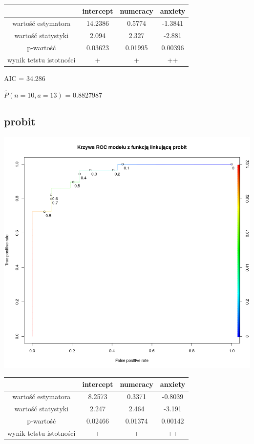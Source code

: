 \documentclass[a4paper,11pt]{article}
\begin{document}
\begin{tabular}{|c|c|c|c|}
 & intercept & numeracy & anxiety \\ \hline
 wartość estymatora &  14.2386 &  0.5774  &   -1.3841   \\
 wartość statystyki & 2.094 & 2.327 &  -2.881 \\
 p-wartość &  0.03623 &   0.01995 &  0.00396  \\
 wynik tetstu istotności & + & + & ++ \\ \hline
\end{tabular}

AIC  =  34.286

$\widehat{P}(n  = 10, a = 13)$  = 0.8827987 
\subsection{probit}
\includegraphics[scale=.25]{plot2.png}

\begin{tabular}{|c|c|c|c|}
 & intercept & numeracy & anxiety \\ \hline
 wartość estymatora &   8.2573  &   0.3371   & -0.8039  \\
 wartość statystyki &  2.247 &  2.464 &  -3.191 \\
 p-wartość &   0.02466 &  0.01374 &   0.00142 \\
 wynik tetstu istotności & + & + & ++ \\ \hline
\end{tabular}
\end{document}
